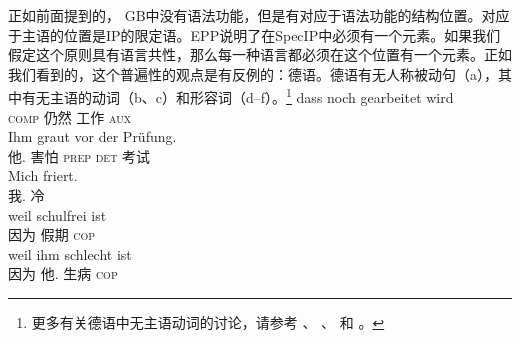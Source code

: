 正如前面提到的， GB中没有语法功能，但是有对应于语法功能的结构位置。对应于主语的位置是IP的限定语。EPP说明了在SpecIP中必须有一个元素。如果我们假定这个原则具有语言共性，那么每一种语言都必须在这个位置有一个元素。正如我们看到的，这个普遍性的观点是有反例的：德语。德语有无人称被动句（a），其中有无主语的动词（b、c）和形容词（d--f）。\footnote{%
	更多有关德语中无主语动词的讨论，请参考 、 、
    和 。
}
\eal
\ex 
\gll dass noch gearbeitet wird\\
	 \textsc{comp} 仍然 工作 \textsc{aux}\\
\ex 
\gll Ihm graut vor der Prüfung.\\
     他.\dat{} 害怕 \textsc{prep} \textsc{det} 考试\\
\ex 
\gll Mich friert.\\
	 我.\acc{} 冷\\
\ex\label{ex-schulfrei}
\gll weil schulfrei ist\\
	 因为 假期 \textsc{cop}\\
\ex\label{ex-schlecht-ist}
\gll weil ihm schlecht ist\\
	 因为 他.\dat{} 生病 \textsc{cop}\\
